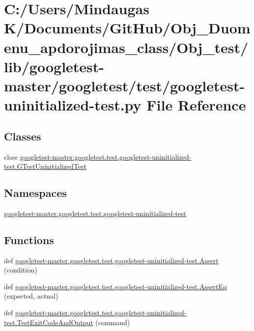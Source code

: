 \hypertarget{_obj__test_2lib_2googletest-master_2googletest_2test_2googletest-uninitialized-test_8py}{}\section{C\+:/\+Users/\+Mindaugas K/\+Documents/\+Git\+Hub/\+Obj\+\_\+\+Duomenu\+\_\+apdorojimas\+\_\+class/\+Obj\+\_\+test/lib/googletest-\/master/googletest/test/googletest-\/uninitialized-\/test.py File Reference}
\label{_obj__test_2lib_2googletest-master_2googletest_2test_2googletest-uninitialized-test_8py}
\subsection*{Classes}
\begin{DoxyCompactItemize}
\item 
class \mbox{\hyperlink{classgoogletest-master_1_1googletest_1_1test_1_1googletest-uninitialized-test_1_1_g_test_uninitialized_test}{googletest-\/master.\+googletest.\+test.\+googletest-\/uninitialized-\/test.\+G\+Test\+Uninitialized\+Test}}
\end{DoxyCompactItemize}
\subsection*{Namespaces}
\begin{DoxyCompactItemize}
\item 
 \mbox{\hyperlink{namespacegoogletest-master_1_1googletest_1_1test_1_1googletest-uninitialized-test}{googletest-\/master.\+googletest.\+test.\+googletest-\/uninitialized-\/test}}
\end{DoxyCompactItemize}
\subsection*{Functions}
\begin{DoxyCompactItemize}
\item 
def \mbox{\hyperlink{namespacegoogletest-master_1_1googletest_1_1test_1_1googletest-uninitialized-test_adc0c9389f0e77548cd19c9d6ca7c941e}{googletest-\/master.\+googletest.\+test.\+googletest-\/uninitialized-\/test.\+Assert}} (condition)
\item 
def \mbox{\hyperlink{namespacegoogletest-master_1_1googletest_1_1test_1_1googletest-uninitialized-test_ad32e5b45b8a3c2749c5379633b6609c6}{googletest-\/master.\+googletest.\+test.\+googletest-\/uninitialized-\/test.\+Assert\+Eq}} (expected, actual)
\item 
def \mbox{\hyperlink{namespacegoogletest-master_1_1googletest_1_1test_1_1googletest-uninitialized-test_a7d8c88e7b8d629dec2908e7748795959}{googletest-\/master.\+googletest.\+test.\+googletest-\/uninitialized-\/test.\+Test\+Exit\+Code\+And\+Output}} (command)
\end{DoxyCompactItemize}
